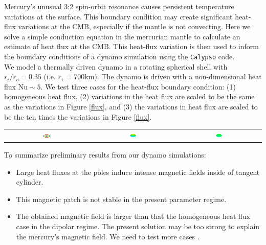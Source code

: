 \documentclass[landscape,a0b,final]{a0poster}
\begin{document}
\begin{multicols}{3}
Mercury's unusual 3:2 spin-orbit resonance causes persistent temperature variations at the surface.  This boundary condition may create significant heat-flux variations at the CMB, especially if the mantle is not convecting.  Here we solve a simple conduction equation in the mercurian mantle to calculate an estimate of heat flux at the CMB.  This heat-flux variation is then used to inform the boundary conditions of a dynamo simulation using the \texttt{Calypso} code.
\\
We model a thermally driven dynamo in a rotating spherical shell with $r_{i}/r_{o} = 0.35$ (i.e.  $r_i$ = 700km).  The dynamo is driven with a non-dimensional heat flux $\mathrm{Nu} \sim 5$.  We test three cases for the heat-flux boundary condition: (1) homogeneous heat flux, (2) variations in the heat flux are scaled to be the same as the variations in Figure \ref{flux}, and (3) the variations in heat flux are scaled to be the ten times the variations in Figure \ref{flux}.
\begin{center}
\begin{tabular}{ccc}
 \includegraphics[width=0.14\textwidth]{CMB_flux.pdf} &
 \includegraphics[width=0.08\textwidth]{br_cmb_x0.png} &
 \includegraphics[width=0.08\textwidth]{br_cmb_x10.png}
\end{tabular}
\label{dynamo}
\end{center}

To summarize preliminary results from our dynamo simulations:
\begin{itemize}
\item Large heat fluxes at the poles induce intense magnetic fields inside of tangent cylinder.
\item This magnetic patch is not stable in the present parameter regime.
\item The obtained magnetic field is larger than that  the homogeneous heat flux case in the dipolar regime. The present solution may be too strong to explain the mercury's magnetic field. We need to test more cases .
\end{itemize}


\end{multicols}
\end{document}
